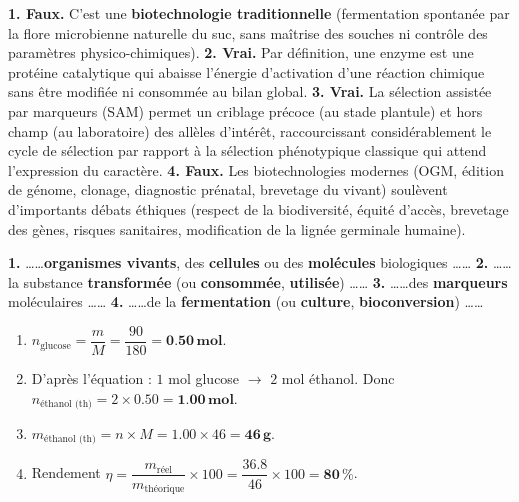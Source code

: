 \documentclass[11pt]{article}
\newcommand{\cle}[1]{{\popxbold\color{popdark}#1}}
\begin{document}
\begin{corrige}
\textbf{1. Faux.} C'est une \textbf{\cle{biotechnologie traditionnelle}} (fermentation spontanée par la flore microbienne naturelle du suc, sans maîtrise des souches ni contrôle des paramètres physico-chimiques).
\textbf{2. Vrai.} Par définition, une \cle{enzyme} est une protéine catalytique qui abaisse l'énergie d'activation d'une réaction chimique sans être modifiée ni consommée au bilan global.
\textbf{3. Vrai.} La \cle{sélection assistée par marqueurs (SAM)} permet un criblage précoce (au stade plantule) et hors champ (au laboratoire) des allèles d'intérêt, raccourcissant considérablement le cycle de sélection par rapport à la sélection phénotypique classique qui attend l'expression du caractère.
\textbf{4. Faux.} Les \cle{biotechnologies modernes} (OGM, édition de génome, clonage, diagnostic prénatal, brevetage du vivant) soulèvent d'importants débats éthiques (respect de la biodiversité, équité d'accès, brevetage des gènes, risques sanitaires, modification de la lignée germinale humaine).
\end{corrige}

\begin{corrige}
\textbf{1.} \dots\dots \textbf{organismes vivants}, des \textbf{cellules} ou des \textbf{molécules} biologiques \dots\dots
\textbf{2.} \dots\dots la substance \textbf{transformée} (ou \textbf{consommée}, \textbf{utilisée}) \dots\dots
\textbf{3.} \dots\dots des \textbf{marqueurs} moléculaires \dots\dots
\textbf{4.} \dots\dots de la \textbf{fermentation} (ou \textbf{culture}, \textbf{bioconversion}) \dots\dots
\end{corrige}

\begin{corrige}
\begin{enumerate}
\item $n_{\text{glucose}} = \dfrac{m}{M} = \dfrac{90}{180} = \mathbf{\num{0,50}\,mol}$.
\item D'après l'équation  : $1$ mol glucose $\rightarrow$ $2$ mol éthanol. Donc $n_{\text{éthanol (th)}} = 2 \times \num{0,50} = \mathbf{\num{1,00}\,mol}$.
\item $m_{\text{éthanol (th)}} = n \times M = \num{1,00} \times 46 = \mathbf{\num{46}\,g}$.
\item Rendement $\eta = \dfrac{m_{\text{réel}}}{m_{\text{théorique}}} \times 100 = \dfrac{\num{36,8}}{46} \times 100 = \mathbf{80\,\%}$.
\end{enumerate}
\end{corrige}
\end{document}
